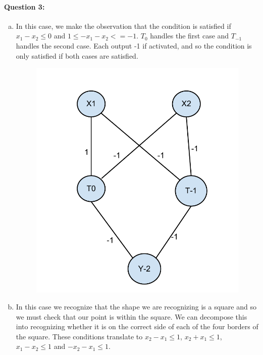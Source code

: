 \documentclass[letterpaper,11pt]{article}
\begin{document}
\paragraph{Question 3:}
\begin{enumerate}[(a)]
\item
    In this case, we make the observation that the condition is satisfied
if $x_1 - x_2 \leq 0$ and $1 \leq -x_1 -x_2 <= -1$. $T_0$ handles the first case
and $T_{-1}$ handles the second case. Each output -1 if activated, and so the
condition is only satisfied if both cases are satisfied.
\begin{figure}[H]
    \centering
    \includegraphics[scale=0.5]{hw5-3a.pdf}
\end{figure}
\item
    In this case we recognize that the shape we are recognizing is a square
    and so we must check that our point is within the square. We can decompose this
    into recognizing whether it is on the correct side of each of the four borders
    of the square. These conditions translate to $x_2 - x_1 \leq 1$,
    $x_2 + x_1 \leq 1$, $x_1 - x_2 \leq 1$ and $-x_2 - x_1 \leq 1$.
\begin{figure}[H]
    \centering

\end{figure}
\end{enumerate}
\end{document}
